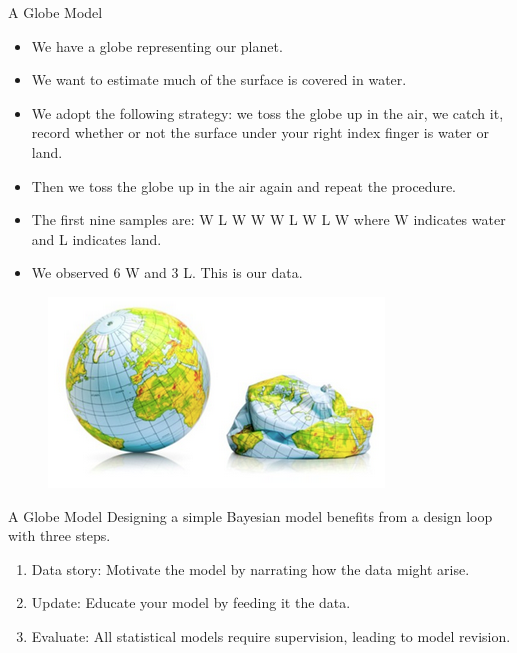 \documentclass[handout]{beamer}
\begin{document}
\begin{frame}{A Globe Model}
\scriptsize{
\begin{itemize}

\item We have a globe representing our planet. 
\item We want to estimate much of the surface is covered in water. 
\item We adopt the following strategy: we toss the globe up in the air, we catch it, record whether or not the surface under your right index finger is water or
land. 
\item Then we toss the globe up in the air again and repeat the procedure.
\item The first nine samples are:
W L W W W L W L W
where W indicates water and L indicates land.
\item We observed 6 W and 3 L. This is our data.
\end{itemize}
 } 
 
\scriptsize{
\begin{figure}[h!]
	\centering
	\includegraphics[scale=0.4]{pics/globe.png}
\end{figure}
 }  

\end{frame}

\begin{frame}{A Globe Model}
Designing a simple Bayesian model benefits from a design loop with three steps.
\begin{enumerate}
 \item Data story: Motivate the model by narrating how the data might arise.
\item Update: Educate your model by feeding it the data.
\item Evaluate: All statistical models require supervision, leading to model revision.
\end{enumerate}

\end{frame}
\end{document}
